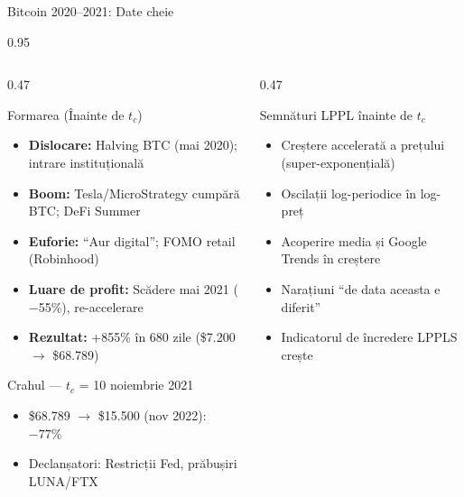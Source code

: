 \documentclass[9pt, aspectratio=169, t]{beamer}
\begin{document}
\begin{frame}{Bitcoin 2020--2021: Date cheie}
    \begin{cminipage}{0.95\textwidth}
    {\scriptsize
    \begin{columns}[T]
        \begin{column}{0.47\textwidth}
            \begin{block}{Formarea (Înainte de $t_c$)}
                \begin{itemize}\setlength{\itemsep}{0pt}
                    \item \textbf{Dislocare:} Halving BTC (mai 2020); intrare instituțională
                    \item \textbf{Boom:} Tesla/MicroStrategy cumpără BTC; DeFi Summer
                    \item \textbf{Euforie:} ``Aur digital''; FOMO retail (Robinhood)
                    \item \textbf{Luare de profit:} Scădere mai 2021 ($-$55\%), re-accelerare
                    \item \textbf{Rezultat:} +855\% în 680 zile (\$7.200 $\to$ \$68.789)
                \end{itemize}
            \end{block}
            \vspace{-1mm}
            \begin{alertblock}{Crahul --- $t_c$ = 10 noiembrie 2021}
                \begin{itemize}\setlength{\itemsep}{0pt}
                    \item \$68.789 $\to$ \$15.500 (nov 2022): $-77\%$
                    \item Declanșatori: Restricții Fed, prăbușiri LUNA/FTX
                \end{itemize}
            \end{alertblock}
        \end{column}
        \begin{column}{0.47\textwidth}
            \begin{exampleblock}{Semnături LPPL înainte de $t_c$}
                \begin{itemize}\setlength{\itemsep}{0pt}
                    \item Creștere accelerată a prețului (super-exponențială)
                    \item Oscilații log-periodice în log-preț
                    \item Acoperire media și Google Trends în creștere
                    \item Narațiuni ``de data aceasta e diferit''
                    \item Indicatorul de încredere LPPLS crește
                \end{itemize}
            \end{exampleblock}


\end{column}
\end{columns}}
\end{cminipage}
\end{frame}
\end{document}

